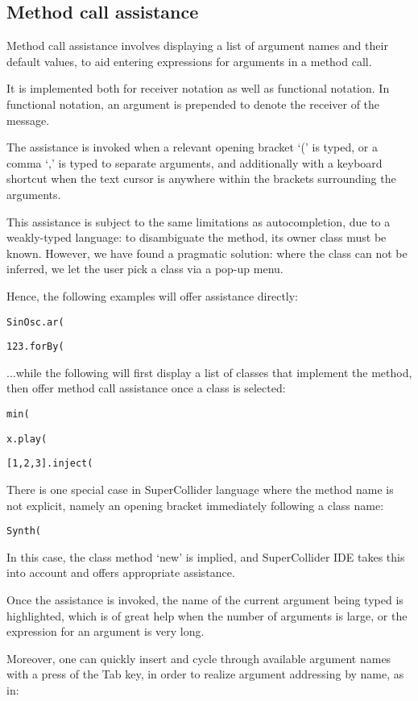 \documentclass[11pt,a4paper]{article}
\begin{document}
\subsection{Method call assistance}

Method call assistance involves displaying a list of argument names and their default values, to aid
entering expressions for arguments in a method call.

It is implemented both for receiver notation as well as functional notation. In functional notation,
an argument is prepended to denote the receiver of the message.

The assistance is invoked when a relevant opening bracket `(' is typed, or a comma `,' is typed to
separate arguments, and additionally with a keyboard shortcut when the text cursor is anywhere
within the brackets surrounding the arguments.

This assistance is subject to the same limitations as autocompletion, due to a weakly-typed
language: to disambiguate the method, its owner class must be known. However, we have found a
pragmatic solution: where the class can not be inferred, we let the user pick a class via a pop-up
menu.

Hence, the following examples will offer assistance directly:

\verb|SinOsc.ar(|

\verb|123.forBy(|

...while the following will first display a list of classes that implement the method, then offer
method call assistance once a class is selected:

\verb|min(|

\verb|x.play(|

\verb|[1,2,3].inject(|

There is one special case in SuperCollider language where the method name is not explicit, namely
an opening bracket immediately following a class name:

\verb|Synth(|

In this case, the class method `new' is implied, and SuperCollider IDE takes this into account and
offers appropriate assistance.

Once the assistance is invoked, the name of the current argument being typed is highlighted, which
is of great help when the number of arguments is large, or the expression for an argument is very
long.

Moreover, one can quickly insert and cycle through available argument names with a press of the Tab
key, in order to realize argument addressing by name, as in:
\end{document}

